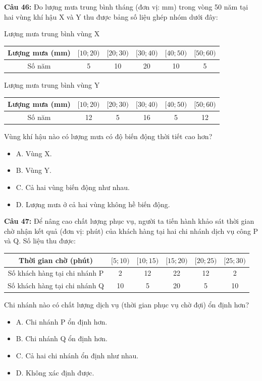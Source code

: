 \documentclass[12pt]{article}
\begin{document}
	\vspace{4mm}
	
	\noindent \textbf{Câu 46:} Đo lượng mưa trung bình tháng (đơn vị: mm) trong vòng 50 năm tại hai vùng khí hậu X và Y thu được bảng số liệu ghép nhóm dưới đây:
	\begin{center}
		Lượng mưa trung bình vùng X
		\renewcommand{\arraystretch}{1.3}
		\begin{tabular}{|c|c|c|c|c|c|}
			\hline
			Lượng mưa (mm) & $[10; 20)$ & $[20; 30)$ & $[30; 40)$ & $[40; 50)$ & $[50; 60)$ \\
			\hline
			Số năm & 5 & 10 & 20 & 10 & 5 \\
			\hline
		\end{tabular}
	\end{center}
	\begin{center}
		Lượng mưa trung bình vùng Y
		\renewcommand{\arraystretch}{1.3}
		\begin{tabular}{|c|c|c|c|c|c|}
			\hline
			Lượng mưa (mm) & $[10; 20)$ & $[20; 30)$ & $[30; 40)$ & $[40; 50)$ & $[50; 60)$ \\
			\hline
			Số năm & 12 & 5 & 16 & 5 & 12 \\
			\hline
		\end{tabular}
	\end{center}
	Vùng khí hậu nào có lượng mưa có độ biến động thời tiết cao hơn?
	\begin{itemize}[label=, leftmargin=*]
		\item A. Vùng X.
		\item B. Vùng Y.
		\item C. Cả hai vùng biến động như nhau.
		\item D. Lượng mưa ở cả hai vùng không hề biến động.
	\end{itemize}
	
	\vspace{4mm}
	
	\noindent \textbf{Câu 47:} Để nâng cao chất lượng phục vụ, người ta tiến hành khảo sát thời gian chờ nhận kết quả (đơn vị: phút) của khách hàng tại hai chi nhánh dịch vụ công P và Q. Số liệu thu được:
	\begin{center}
		\renewcommand{\arraystretch}{1.3}
		\begin{tabular}{|c|c|c|c|c|c|}
			\hline
			Thời gian chờ (phút) & $[5; 10)$ & $[10; 15)$ & $[15; 20)$ & $[20; 25)$ & $[25; 30)$ \\
			\hline
			Số khách hàng tại chi nhánh P & 2 & 12 & 22 & 12 & 2 \\
			\hline
			Số khách hàng tại chi nhánh Q & 10 & 5 & 20 & 5 & 10 \\
			\hline
		\end{tabular}
	\end{center}
	Chi nhánh nào có chất lượng dịch vụ (thời gian phục vụ chờ đợi) ổn định hơn?
	\begin{itemize}[label=, leftmargin=*]
		\item A. Chi nhánh P ổn định hơn.
		\item B. Chi nhánh Q ổn định hơn.
		\item C. Cả hai chi nhánh ổn định như nhau.
		\item D. Không xác định được.
	\end{itemize}
	
\end{document}
